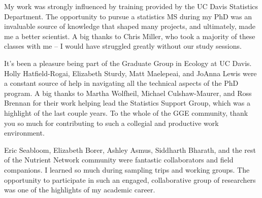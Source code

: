 \documentclass[twoside,12pt,final]{ucthesis-CA2012}
\begin{document}
\begin{ucfrontmatter}
\begin{acknowledgements}
    My work was strongly influenced by training provided by the UC Davis Statistics Department. The opportunity to pursue a statistics MS during my PhD was an invaluable source of knowledge that shaped many projects, and ultimately, made me a better scientist. A big thanks to Chris Miller, who took a majority of these classes with me -- I would have struggled greatly without our study sessions.

    It's been a pleasure being part of the Graduate Group in Ecology at UC Davis. Holly Hatfield-Rogai, Elizabeth Sturdy, Matt Maelepeai, and JoAnna Lewis were a constant source of help in navigating all the technical aspects of the PhD program. A big thanks to Martha Wolfheil, Michael Culshaw-Maurer, and Ross Brennan for their work helping lead the Statistics Support Group, which was a highlight of the last couple years. To the whole of the GGE community, thank you so much for contributing to such a collegial and productive work environment.

    Eric Seabloom, Elizabeth Borer, Ashley Asmus, Siddharth Bharath, and the rest of the Nutrient Network community were fantastic collaborators and field companions. I learned so much during sampling trips and working groups. The opportunity to participate in such an engaged, collaborative group of researchers was one of the highlights of my academic career.


\end{acknowledgements}
\end{ucfrontmatter}
\end{document}
